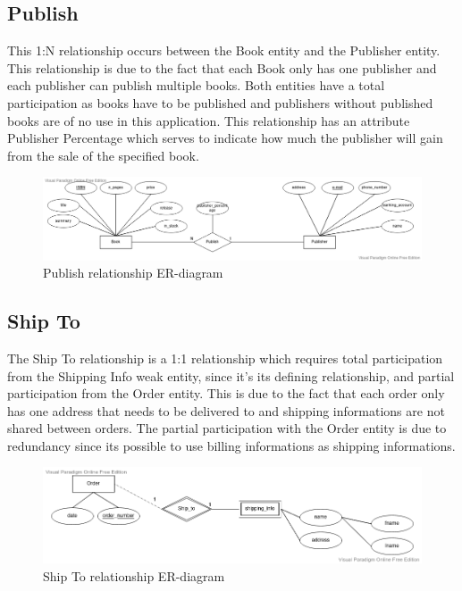 \documentclass[fleqn]{scrreprt}
\begin{document}
\subsection{Publish}
This 1:N relationship occurs between the Book entity and the Publisher entity.
This relationship is due to the fact that each Book only has one publisher and
each publisher can publish multiple books. Both entities have a total
participation as books have to be published and publishers without published
books are of no use in this application. This relationship has an attribute
Publisher Percentage which serves to indicate how much the publisher will gain
from the sale of the specified book.
\begin{figure}[h]\centering
    \includegraphics[width=\columnwidth]{er-diagram-project-Publish.vpd.png}
    \caption{Publish relationship ER-diagram}\label{fig:erpu}
\end{figure}

\newpage
\subsection{Ship To}
The Ship To relationship is a 1:1 relationship which requires total participation
from the Shipping Info weak entity, since it's its defining relationship,
and partial participation from the Order entity. This is due to the fact
that each order only has one address that needs to be delivered to and shipping
informations are not shared between orders. The partial participation with the
Order entity is due to redundancy since its possible to use billing informations
as shipping informations.
\begin{figure}[h]\centering
    \includegraphics[width=\columnwidth]{er-diagram-project-Ship-To.vpd.png}
    \caption{Ship To relationship ER-diagram}\label{fig:erst}
\end{figure}
\end{document}
